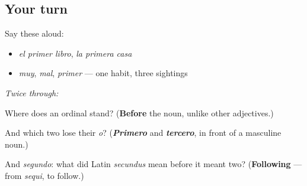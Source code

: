 \subsection*{Your turn}
Say these aloud:

\begin{itemize}
\raggedright
  \item \emph{el primer libro}, \emph{la primera casa}
  \item \emph{muy}, \emph{mal}, \emph{primer} — one habit, three sightings
\end{itemize}

\emph{Twice through:}

\begin{tcolorbox}[breakable,colback=teal!4,colframe=teal!35!black,title={Before you move on}]
Where does an ordinal stand? (\textbf{Before} the noun, unlike other adjectives.)

And which two lose their \emph{o}? (\emph{\textbf{Primero}} and \emph{\textbf{tercero}}, in front of a masculine noun.)

And \emph{segundo}: what did Latin \emph{secundus} mean before it meant two? (\textbf{Following} — from \emph{sequi}, to follow.)
\end{tcolorbox}
